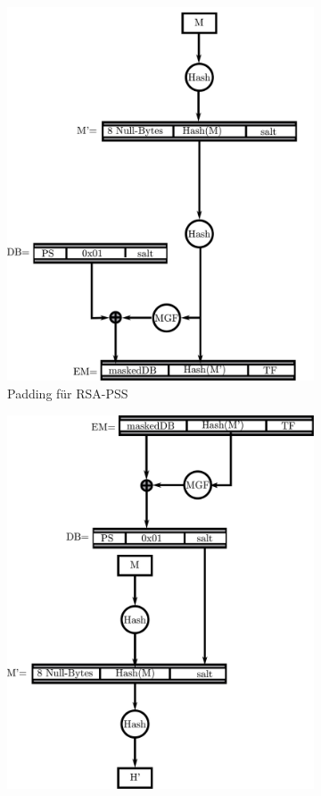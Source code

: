 \begin{figure}[h] \centering
  \begin{subfigure}[b]{.45\textwidth}
    \includegraphics[width=\textwidth]{images/pss.pdf}
    \caption{Padding für RSA-PSS}
    \label{fig:pss}
  \end{subfigure}
  \begin{subfigure}[b]{.45\textwidth}
    \includegraphics[width=\textwidth]{images/pss-vfy.pdf}

\end{subfigure}
\end{figure}
